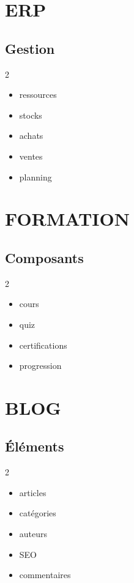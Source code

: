 \documentclass[12pt,a4paper,oneside]{book}
\begin{document}
\chapter{ERP}

\section{Gestion}
\begin{multicols}{2}
\begin{itemize}
\item ressources
\item stocks
\item achats
\item ventes
\item planning
\end{itemize}
\end{multicols}

\chapter{FORMATION}

\section{Composants}
\begin{multicols}{2}
\begin{itemize}
\item cours
\item quiz
\item certifications
\item progression
\end{itemize}
\end{multicols}

\chapter{BLOG}

\section{Éléments}
\begin{multicols}{2}
\begin{itemize}
\item articles
\item catégories
\item auteurs
\item SEO
\item commentaires
\end{itemize}
\end{multicols}
\end{document}
